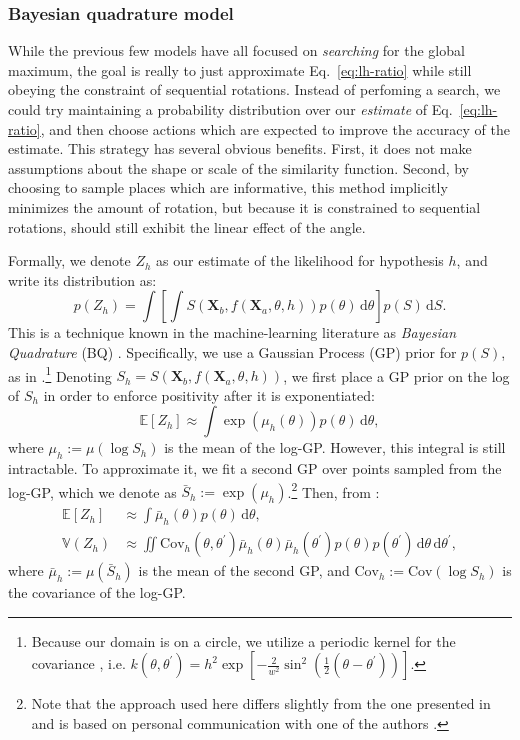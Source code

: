 \documentclass[10pt,letterpaper]{article}
\newcommand{\Xa}[0]{\mathbf{X}_a}
\newcommand{\Xb}[0]{\mathbf{X}_b}
\newcommand{\dif}[0]{\,\mathrm{d}}
\begin{document}
\subsubsection{Bayesian quadrature model}

While the previous few models have all focused on \textit{searching}
for the global maximum, the goal is really to just approximate
Eq.~\ref{eq:lh-ratio} while still obeying the constraint of sequential
rotations. Instead of perfoming a search, we could try maintaining a
probability distribution over our \textit{estimate} of
Eq.~\ref{eq:lh-ratio}, and then choose actions which are expected to
improve the accuracy of the estimate. This strategy has several
obvious benefits. First, it does not make assumptions about the shape
or scale of the similarity function. Second, by choosing to sample
places which are informative, this method implicitly minimizes the
amount of rotation, but because it is constrained to sequential
rotations, should still exhibit the linear effect of the angle.

Formally, we denote $Z_h$ as our estimate of the likelihood for
hypothesis $h$, and write its distribution as:
\begin{equation}
  p(Z_h) = \int \left[\int S(\Xb, f(\Xa, \theta, h))p(\theta)\dif\theta\right] p(S)\dif S.
\end{equation}
This is a technique known in the machine-learning literature as
\textit{Bayesian Quadrature} (BQ)
\cite{Diaconis:1988uo,OHagan:1991tx,Osborne:2012tm}. Specifically, we
use a Gaussian Process (GP) prior for $p(S)$, as in
.\footnote{Because our domain is on a circle, we
  utilize a periodic kernel for the covariance
  \cite{Rasmussen:2006vz}, i.e. $k(\theta,
  \theta^\prime)=h^2\exp[-\frac{2}{w^2}\sin^2(\frac{1}{2}(\theta-\theta^\prime))]$.}
Denoting $S_h=S(\Xb, f(\Xa, \theta, h))$, we first place a GP prior on
the log of $S_h$ in order to enforce positivity after it is
exponentiated:
\begin{equation}
\mathbb{E}[Z_h] \approx \int \exp(\mu_h(\theta))p(\theta)\dif\theta,
\end{equation}
where $\mu_h:=\mu(\log S_h)$ is the mean of the log-GP. However, this
integral is still intractable. To approximate it, we fit a second GP
over points sampled from the log-GP, which we denote as
$\bar{S}_h:=\exp(\mu_h)$.\footnote{Note that the approach used here
  differs slightly from the one presented in 
  and is based on personal communication with one of the authors
  \cite{Duvenaud:2013td}.} Then, from :
\begin{align}
  \mathbb{E}[Z_h] &\approx \int \bar{\mu}_h(\theta)p(\theta)\dif\theta,\\
  \mathbb{V}(Z_h) &\approx \iint \mathrm{Cov}_h(\theta,
  \theta^\prime)\bar{\mu}_h(\theta)\bar{\mu}_h(\theta^\prime)p(\theta)p(\theta^\prime)\dif\theta\dif\theta^\prime,
\end{align}
where $\bar{\mu}_h:=\mu(\bar{S}_h)$ is the mean of the second GP, and
$\mathrm{Cov}_h:=\mathrm{Cov}(\log S_h)$ is the covariance of the
log-GP.
\end{document}
